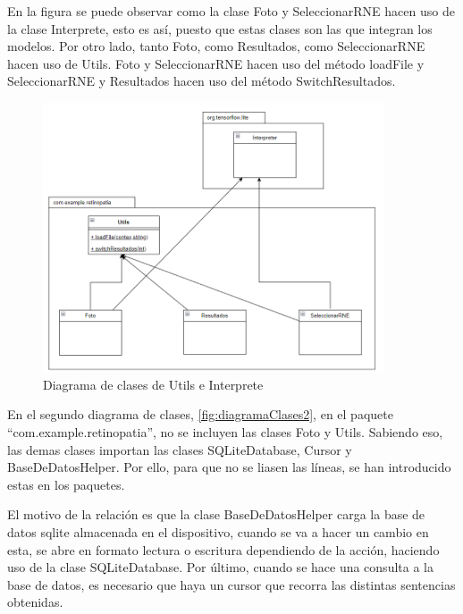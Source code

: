     En la figura se puede observar como la clase Foto y SeleccionarRNE hacen uso de la clase Interprete, esto es así, puesto que estas clases son las que integran los modelos. Por otro lado, tanto Foto, como Resultados, como SeleccionarRNE hacen uso de Utils. Foto y SeleccionarRNE hacen uso del método loadFile y SeleccionarRNE y Resultados hacen uso del método SwitchResultados.
    
        \begin{figure}[!ht]
                 \centering
                 \includegraphics[width=0.9\textwidth]{img/Diagrama de clases 1.png}
                  \caption{Diagrama de clases de Utils e Interprete}
                 \label{fig:diagramaClases1}
        \end{figure}


    En el segundo diagrama de clases, \ref{fig:diagramaClases2}, en el paquete ``com.example.retinopatia'', no se incluyen las clases Foto y Utils. Sabiendo eso, las demas clases importan las clases SQLiteDatabase, Cursor y BaseDeDatosHelper. Por ello, para que no se liasen las líneas, se han introducido estas en los paquetes.

    El motivo de la relación es que la clase BaseDeDatosHelper carga la base de datos sqlite almacenada en el dispositivo, cuando se va a hacer un cambio en esta, se abre en formato lectura o escritura dependiendo de la acción, haciendo uso de la clase SQLiteDatabase.
    Por último, cuando se hace una consulta a la base de datos, es necesario que haya un cursor que recorra las distintas sentencias obtenidas.

